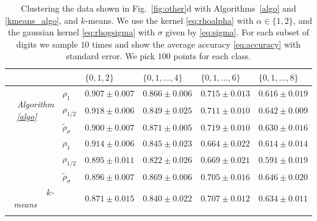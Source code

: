 \documentclass[aps,preprint,nofootinbib,floatfix]{revtex4-1}
\begin{document}
\begin{table}
\begin{tabular}{@{}r l | l | l | l | l@{}}
\toprule[1pt]
& & $\{0,1,2\}$ &
$\{0,1,\dotsc,4\}$ &
$\{0,1,\dotsc,6\}$ &
$\{0,1,\dotsc,8\}$ \\
\midrule[0.5pt]
\multirow{3}{*}{\emph{Algorithm \ref{algo}}~~~~} 
& $\rho_{1}$ 
&$0.907\pm 0.007$
&$0.866\pm 0.006$
&$0.715\pm 0.013$
&$0.616\pm 0.019$
\\
& $\rho_{1/2}$ 
&$\bm{0.918\pm 0.006}$
&$0.849\pm 0.025$
&$0.711\pm 0.010$
&$0.642\pm 0.009$
\\
& $\widetilde{\rho}_{\sigma}$ 
&$0.900\pm 0.007$
&$\bm{0.871\pm 0.005}$
&$\bm{0.719\pm 0.010}$
&$0.630\pm 0.016$
\\
\arrayrulecolor{gray!80}\midrule[0.5pt]
\multirow{3}{*}{\emph{Algorithm \ref{kmeans_algo}}~~~~} 
& $\rho_{1}$ 
&$0.914\pm 0.006$
&$0.845\pm 0.023$
&$0.664\pm 0.022$
&$0.614\pm 0.014$
\\
& $\rho_{1/2}$ 
&$0.895\pm 0.011$
&$0.822 \pm 0.026$
&$0.669\pm 0.021$
&$0.591\pm 0.019$
\\
& $\widetilde{\rho}_{\sigma}$ 
&$0.896\pm 0.007$
&$0.869\pm 0.006$
&$0.705\pm 0.016$
&$\bm{0.646\pm 0.020}$
\\
\arrayrulecolor{gray!80}\midrule[0.5pt]
\emph{$k$-means}~~~~ &
&$0.871\pm 0.015$
&$0.840\pm 0.022$
&$0.707\pm 0.012$
&$0.634\pm 0.011$
\\
\arrayrulecolor{black}\bottomrule[1pt]
\end{tabular}
\caption{\label{table:mnist}
Clustering the data shown in Fig.~\ref{fig:other}d with Algorithms~\ref{algo}
and \ref{kmeans_algo}, and $k$-means.
We use the kernel \eqref{eq:rhoalpha} with $\alpha\in\{1,2\}$, and
the gaussian kernel 
\eqref{eq:rhogsigma} with $\sigma$ given by \eqref{eq:sigma}. 
For each subset of digits we sample $10$ times and show the average
accuracy \eqref{eq:accuracy} with standard error. We pick $100$ points for 
each class.
}
\end{table}
\end{document}
